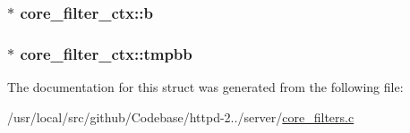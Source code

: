 \subsubsection[{\texorpdfstring{b}{b}}]{$\ast$ core\+\_\+filter\+\_\+ctx\+::b}\hypertarget{structcore__filter__ctx_ab083b63e4b9c6f6a8b722fefd6e18da3}{}\label{structcore__filter__ctx_ab083b63e4b9c6f6a8b722fefd6e18da3}
\subsubsection[{\texorpdfstring{tmpbb}{tmpbb}}]{$\ast$ core\+\_\+filter\+\_\+ctx\+::tmpbb}\hypertarget{structcore__filter__ctx_ad7fcd6257894c70855b5b43c6f84c453}{}\label{structcore__filter__ctx_ad7fcd6257894c70855b5b43c6f84c453}


The documentation for this struct was generated from the following file\+:\begin{DoxyCompactItemize}
\item 
/usr/local/src/github/\+Codebase/httpd-\/2../server/\hyperlink{core__filters_8c}{core\+\_\+filters.\+c}\end{DoxyCompactItemize}
